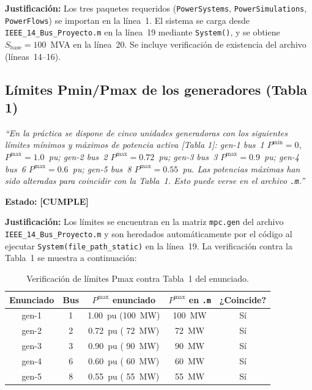 \documentclass[12pt, a4paper]{article}
\newcommand{\cumple}{\textcolor{okgreen}{\textbf{[CUMPLE]}}}
\begin{document}
\textbf{Justificación:}
Los tres paquetes requeridos (\texttt{PowerSystems}, \texttt{PowerSimulations},
\texttt{PowerFlows}) se importan en la línea~1.
El sistema se carga desde \texttt{IEEE\_14\_Bus\_Proyecto.m} en la línea~19
mediante \texttt{System()}, y se obtiene $S_\text{base}=100$~MVA en la línea~20.
Se incluye verificación de existencia del archivo (líneas~14--16).

\subsection{Límites Pmin/Pmax de los generadores (Tabla 1)}

\begin{enunciadobox}
\textit{``En la práctica se dispone de cinco unidades generadoras con los siguientes
límites mínimos y máximos de potencia activa [Tabla 1]:
gen-1 bus~1 $P^\text{min}=0$, $P^\text{max}=1.0$~pu;
gen-2 bus~2 $P^\text{max}=0.72$~pu;
gen-3 bus~3 $P^\text{max}=0.9$~pu;
gen-4 bus~6 $P^\text{max}=0.6$~pu;
gen-5 bus~8 $P^\text{max}=0.55$~pu.
Las potencias máximas han sido alteradas para coincidir con la Tabla~1.
Esto puede verse en el archivo \texttt{.m}.''}
\end{enunciadobox}

\textbf{Estado:} \cumple

\textbf{Justificación:}
Los límites se encuentran en la matriz \texttt{mpc.gen} del archivo
\texttt{IEEE\_14\_Bus\_Proyecto.m} y son heredados automáticamente por el código
al ejecutar \texttt{System(file\_path\_static)} en la línea~19.
La verificación contra la Tabla~1 se muestra a continuación:

\begin{table}[h!]
\centering
\begin{tabular}{ccccc}
\toprule
Enunciado & Bus & $P^\text{max}$ enunciado & $P^\text{max}$ en \texttt{.m} & ¿Coincide? \\
\midrule
gen-1 & 1 & 1.00~pu (100~MW) & 100~MW & \textcolor{okgreen}{Sí} \\
gen-2 & 2 & 0.72~pu ( 72~MW) &  72~MW & \textcolor{okgreen}{Sí} \\
gen-3 & 3 & 0.90~pu ( 90~MW) &  90~MW & \textcolor{okgreen}{Sí} \\
gen-4 & 6 & 0.60~pu ( 60~MW) &  60~MW & \textcolor{okgreen}{Sí} \\
gen-5 & 8 & 0.55~pu ( 55~MW) &  55~MW & \textcolor{okgreen}{Sí} \\
\bottomrule
\end{tabular}
\caption{Verificación de límites Pmax contra Tabla~1 del enunciado.}
\end{table}
\end{document}
